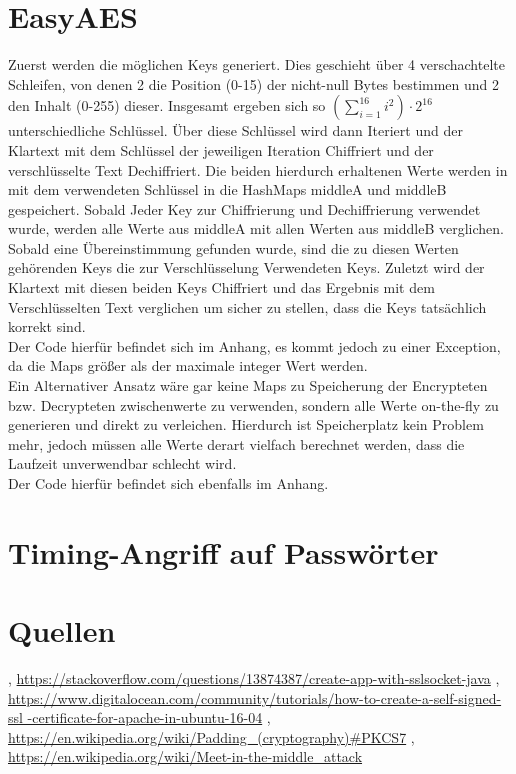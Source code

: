 \documentclass[12pt]{article}
\theoremstyle{plain}
\begin{document}
\section{EasyAES}
Zuerst werden die möglichen Keys generiert. Dies geschieht über 4 verschachtelte Schleifen, von denen 2 die Position (0-15) der nicht-null Bytes bestimmen und 2 den Inhalt (0-255) dieser. Insgesamt ergeben sich so $(\sum_{i=1}^{16} i^2)\cdot 2^{16}$ unterschiedliche Schlüssel. Über diese Schlüssel wird dann Iteriert und der Klartext mit dem Schlüssel der jeweiligen Iteration Chiffriert und der verschlüsselte Text Dechiffriert. Die beiden hierdurch erhaltenen Werte werden in mit dem verwendeten Schlüssel in die HashMaps middleA und middleB gespeichert. Sobald Jeder Key zur Chiffrierung und Dechiffrierung verwendet wurde, werden alle Werte aus middleA mit allen Werten aus middleB verglichen. Sobald eine Übereinstimmung gefunden wurde, sind die zu diesen Werten gehörenden Keys die zur Verschlüsselung Verwendeten Keys. Zuletzt wird der Klartext mit diesen beiden Keys Chiffriert und das Ergebnis mit dem Verschlüsselten Text verglichen um sicher zu stellen, dass die Keys tatsächlich korrekt sind.\\
Der Code hierfür befindet sich im Anhang, es kommt jedoch zu einer Exception, da die Maps größer als der maximale integer Wert werden.\\
Ein Alternativer Ansatz wäre gar keine Maps zu Speicherung der Encrypteten bzw. Decrypteten zwischenwerte zu verwenden, sondern alle Werte on-the-fly zu generieren und direkt zu verleichen. Hierdurch ist Speicherplatz kein Problem mehr, jedoch müssen alle Werte derart vielfach berechnet werden, dass die Laufzeit unverwendbar schlecht wird.\\
Der Code hierfür befindet sich ebenfalls im Anhang.
\section{Timing-Angriff auf Passwörter}
\section{Quellen}
\begin{thebibliography}{50}
\bibitem [SSLSockets] , \url{https://stackoverflow.com/questions/13874387/create-app-with-sslsocket-java}
, \url{https://www.digitalocean.com/community/tutorials/how-to-create-a-self-signed-ssl
-certificate-for-apache-in-ubuntu-16-04}
\bibitem [Padding] , \url{https://en.wikipedia.org/wiki/Padding_(cryptography)#PKCS7}
 , \url{https://en.wikipedia.org/wiki/Meet-in-the-middle_attack}
\end{thebibliography}
\end{document}
